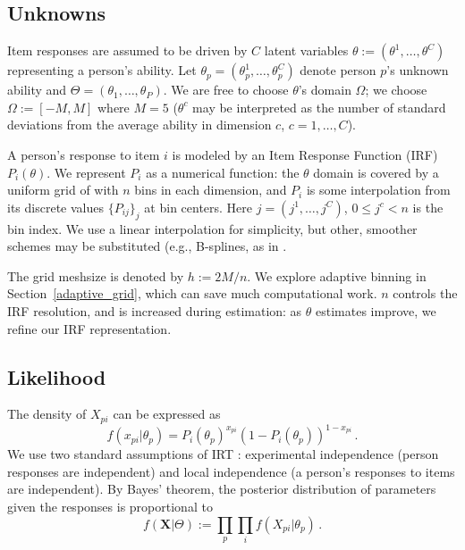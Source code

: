 \documentclass{article}
\newcommand{\bX}{\mathbf{X}}
\newcommand{\ta}{\theta}
\begin{document}
\subsection{Unknowns}
Item responses are assumed to be driven by $C$ latent variables $\ta := (\ta^1,\dots,\ta^C)$ representing a person's ability. Let $\ta_p=(\ta_p^1,\dots,\ta_p^C)$ denote person $p$'s unknown ability and $\Theta = (\ta_1,\dots,\ta_P)$. We are free to choose $\ta$'s domain $\Omega$; we choose $\Omega := [-M,M]$ where $M = 5$ ($\ta^c$ may be interpreted as the number of standard deviations from the average ability in dimension $c$, $c=1,\dots,C$).

A person's response to item $i$ is modeled by an Item Response Function (IRF) $P_i(\ta)$. We represent
$P_i$ as a numerical function: the $\ta$ domain is covered by a uniform grid of with $n$ bins in each
dimension, and $P_i$ is some interpolation from its discrete values $\{P_{ij}\}_j$ at bin centers. Here
$j=(j^1,\dots,j^C)$, $0 \leq j^c < n$ is the bin index. We use a linear interpolation for simplicity, but
other, smoother schemes may be substituted (e.g., B-splines, as in \cite{matt_bsplines}.

The grid meshsize is denoted by $h := 2 M / n$. We explore adaptive binning in Section~\ref{adaptive_grid},
which can save much computational work. $n$ controls the IRF resolution, and is increased during estimation:
as $\theta$ estimates improve, we refine our IRF representation.

\subsection{Likelihood}
The density of $X_{pi}$ can be expressed as 
\begin{equation}
  f(x_{pi}|\ta_p) = P_i(\ta_p)^{x_{pi}} \left(1 - P_i(\ta_p)\right)^{1-x_{pi}}\,.
\end{equation}
We use two standard assumptions of IRT \cite{junker}: experimental independence (person responses are independent) and local independence (a person's responses to items are independent).
By Bayes' theorem, the posterior distribution of parameters given the responses is proportional to
\begin{equation}
  f(\bX|\Theta) := \prod_p \prod_i f(X_{pi}|\ta_p)\,.
  \label{like}
\end{equation}
\end{document}
